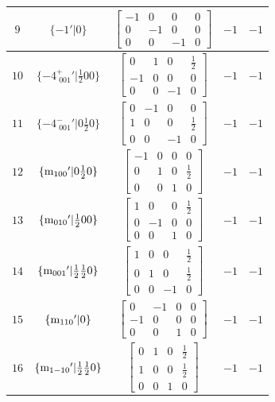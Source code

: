 \documentclass[fleqn,8pt]{jsarticle}
\begin{document}
\begin{longtable}{ccccc}
$ 9 $ & $ \{-1{}'|0\} $ & $ \begin{bmatrix} -1 & 0 & 0 & 0 \\ 0 & -1 & 0 & 0 \\ 0 & 0 & -1 & 0 \end{bmatrix} $ & $ -1 $ & $ -1 $ \\ \hline
$ 10 $ & $ \{-4^{+}_{\,\,001}{}'|\frac{1}{2} 0 0\} $ & $ \begin{bmatrix} 0 & 1 & 0 & \frac{1}{2} \\ -1 & 0 & 0 & 0 \\ 0 & 0 & -1 & 0 \end{bmatrix} $ & $ -1 $ & $ -1 $ \\ \hline
$ 11 $ & $ \{-4^{-}_{\,\,001}{}'|0 \frac{1}{2} 0\} $ & $ \begin{bmatrix} 0 & -1 & 0 & 0 \\ 1 & 0 & 0 & \frac{1}{2} \\ 0 & 0 & -1 & 0 \end{bmatrix} $ & $ -1 $ & $ -1 $ \\ \hline
$ 12 $ & $ \{{\rm m}_{100}{}'|0 \frac{1}{2} 0\} $ & $ \begin{bmatrix} -1 & 0 & 0 & 0 \\ 0 & 1 & 0 & \frac{1}{2} \\ 0 & 0 & 1 & 0 \end{bmatrix} $ & $ -1 $ & $ -1 $ \\ \hline
$ 13 $ & $ \{{\rm m}_{010}{}'|\frac{1}{2} 0 0\} $ & $ \begin{bmatrix} 1 & 0 & 0 & \frac{1}{2} \\ 0 & -1 & 0 & 0 \\ 0 & 0 & 1 & 0 \end{bmatrix} $ & $ -1 $ & $ -1 $ \\ \hline
$ 14 $ & $ \{{\rm m}_{001}{}'|\frac{1}{2} \frac{1}{2} 0\} $ & $ \begin{bmatrix} 1 & 0 & 0 & \frac{1}{2} \\ 0 & 1 & 0 & \frac{1}{2} \\ 0 & 0 & -1 & 0 \end{bmatrix} $ & $ -1 $ & $ -1 $ \\ \hline
$ 15 $ & $ \{{\rm m}_{110}{}'|0\} $ & $ \begin{bmatrix} 0 & -1 & 0 & 0 \\ -1 & 0 & 0 & 0 \\ 0 & 0 & 1 & 0 \end{bmatrix} $ & $ -1 $ & $ -1 $ \\ \hline
$ 16 $ & $ \{{\rm m}_{1-10}{}'|\frac{1}{2} \frac{1}{2} 0\} $ & $ \begin{bmatrix} 0 & 1 & 0 & \frac{1}{2} \\ 1 & 0 & 0 & \frac{1}{2} \\ 0 & 0 & 1 & 0 \end{bmatrix} $ & $ -1 $ & $ -1 $ \\
\end{longtable}
\end{document}
